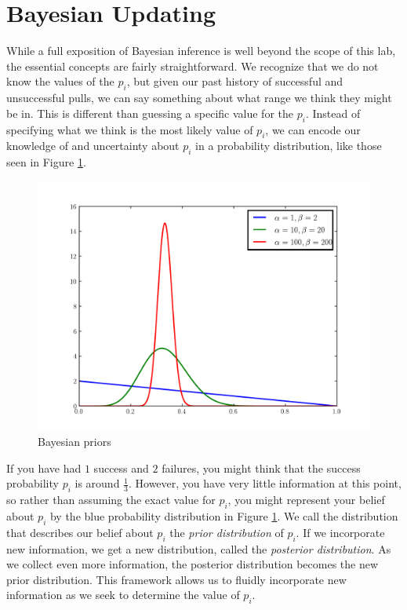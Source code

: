 \section*{Bayesian Updating}
While a full exposition of Bayesian inference is well beyond the
scope of this lab, the essential concepts are fairly straightforward.
We recognize that we do not know the values of the $p_i$,
but given our past history of successful and unsuccessful
pulls, we can say something about what range we think they might be in.
This is different than guessing a specific value for the $p_i$.
Instead of specifying what we think is the most likely value of $p_i$, 
we can encode our knowledge of and uncertainty about $p_i$ in a 
probability distribution,
like those seen in Figure \ref{fig:priors}.
\begin{figure}

\centering
\includegraphics[width=\textwidth]{priors.pdf}
\caption{Bayesian priors}
\label{fig:priors}
\end{figure}

If you have had $1$ success and $2$ failures, you might
think that the success probability 
$p_i$ is around $\frac{1}{3}$.
However, you have very little information at this point,
so rather than assuming the exact value for $p_i$, 
you might represent your belief about $p_i$
by the blue probability distribution in Figure \ref{fig:priors}.
We call the distribution that describes our belief about $p_i$
the \emph{prior distribution} of $p_i$.  If we incorporate new information,
we get a new distribution, called the \emph{posterior distribution}.
As we collect even more information, the posterior distribution becomes 
the new prior distribution. This framework allows us to fluidly incorporate
new information as we seek to determine the value of $p_i$.

